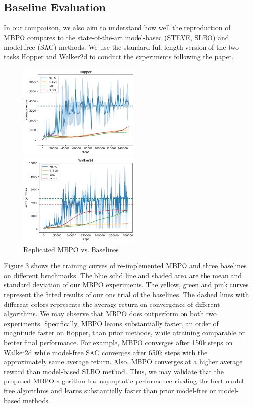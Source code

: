 \subsection{Baseline Evaluation}

In our comparison, we also aim to understand how well the reproduction of MBPO compares to the state-of-the-art model-based (STEVE, SLBO) and model-free (SAC) methods. We use the standard full-length version of the two tasks Hopper and Walker2d to conduct the experiments following the paper. 

\begin{figure}[h]
\centering
\begin{minipage}[t]{0.48\textwidth}
\centering
\includegraphics[width=6cm]{../openreview/Picture1.png}
\end{minipage}
\begin{minipage}[t]{0.48\textwidth}
\centering
\includegraphics[width=6cm]{../openreview/Picture2.png}
\end{minipage}
\caption{Replicated MBPO vs. Baselines}
\end{figure}

Figure 3 shows the training curves of re-implemented MBPO and three baselines on different benchmarks. The blue solid line and shaded area are the mean and standard deviation of our MBPO experiments. The yellow, green and pink curves represent the fitted results of our one trial of the baselines. The dashed lines with different colors represents the average return on convergence of different algorithms. We may observe that MBPO does outperform on both two experiments. Specifically, MBPO learns substantially faster, an order of magnitude faster on Hopper, than prior methods, while attaining comparable or better final performance. For example, MBPO converges after 150k steps on Walker2d while model-free SAC converges after 650k steps with the approximately same average return. Also, MBPO converges at a higher average reward than model-based SLBO method. Thus, we may validate that the proposed MBPO algorithm has asymptotic performance rivaling the best model-free algorithms and learns substantially faster than prior model-free or model-based methods.

